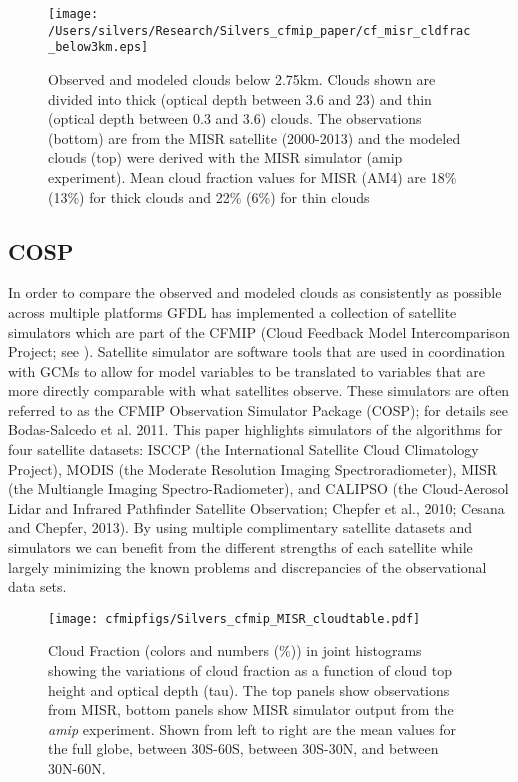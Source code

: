 \documentclass[draft]{agujournal2019}
\begin{document}
\begin{figure}
  \centering
  \texttt{[image: /Users/silvers/Research/Silvers\_cfmip\_paper/cf\_misr\_cldfrac\_below3km.eps]}
  \caption{Observed and modeled clouds below 2.75km.  Clouds shown are divided into thick 
  (optical depth between 3.6 and 23) and thin (optical depth between 0.3 and 3.6) 
  clouds.  The observations (bottom) are from the MISR satellite (2000-2013) and the modeled clouds (top) were derived 
  with the MISR simulator (amip experiment). Mean cloud fraction values for MISR 
  (AM4) are 18\% (13\%) for thick clouds and 22\% (6\%) for thin clouds}
  \label{fig:cf_misr_lowcl}
\end{figure}

\subsection{COSP}
In order to compare the observed and modeled clouds as consistently as possible across multiple platforms 
GFDL has implemented a collection of satellite simulators which are part of the 
CFMIP (Cloud Feedback Model Intercomparison Project; see \cite{Webb_etal_2017}).  Satellite simulator
are software tools that are used in coordination with GCMs to allow for model variables 
to be translated to variables that are more directly comparable with what satellites observe.  
These simulators are often referred to as the CFMIP Observation Simulator Package (COSP); for
details see Bodas-Salcedo et al. 2011.  This paper highlights simulators of the algorithms for 
four satellite datasets: ISCCP (the International Satellite Cloud Climatology Project), 
MODIS (the Moderate Resolution Imaging Spectroradiometer), 
MISR (the Multiangle Imaging Spectro-Radiometer), and 
CALIPSO (the Cloud-Aerosol Lidar and Infrared Pathfinder Satellite Observation; 
Chepfer et al., 2010; Cesana and Chepfer, 2013).  By using multiple complimentary satellite 
datasets and simulators we can benefit from the different strengths of each satellite while largely 
minimizing the known problems and discrepancies of the observational data sets.      

\begin{figure}
  \centering
  \texttt{[image: cfmipfigs/Silvers\_cfmip\_MISR\_cloudtable.pdf]}
  \caption{Cloud Fraction (colors and numbers (\%)) in joint histograms showing the variations of cloud fraction 
  as a function of cloud top height and optical depth (tau).
  The top panels show observations from MISR, bottom panels show MISR simulator output from the 
  \textit{amip} experiment.  Shown from left to right are the mean values for the full globe, between 30S-60S,
  between 30S-30N, and between 30N-60N.}
  \label{fig:misr_sim_vs_mod}
\end{figure}
\end{document}

